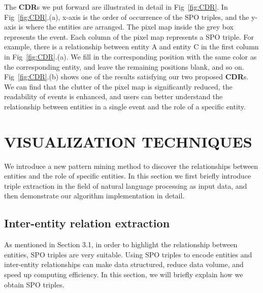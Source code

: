 \documentclass[review,journal]{vgtc}         %
\begin{document}
The \textbf{CDR}s we put forward are illustrated in detail in Fig~\ref{fig:CDR}. In Fig~\ref{fig:CDR}.(a), x-axis is the order of occurrence of the SPO triples, and the y-axis is where the entities are arranged. The pixel map inside the grey box represents the event. Each column of the pixel map represents a SPO triple. For example, there is a relationship between entity A and entity C in the first column in Fig~\ref{fig:CDR}.(a). We fill in the corresponding position with the same color as the corresponding entity, and leave the remaining positions blank, and so on. Fig~\ref{fig:CDR}.(b) shows one of the results satisfying our two proposed \textbf{CDR}s. We can find that the clutter of the pixel map is significantly reduced, the readability of events is enhanced, and users can better understand the relationship between entities in a single event and the role of a specific entity.


\section{VISUALIZATION TECHNIQUES}
\noindent  We introduce a new pattern mining method to discover the relationships between entities and the role of specific entities. In this section we first briefly introduce triple extraction in the field of natural language processing as input data, and then demonstrate our algorithm implementation in detail.

\subsection{Inter-entity relation extraction}
\noindent As mentioned in Section 3.1, in order to highlight the relationship between entities, SPO triples are very suitable. Using SPO triples to encode entities and inter-entity relationships can make data structured, reduce data volume, and speed up computing efficiency. In this section, we will briefly explain how we obtain SPO triples.
\end{document}
